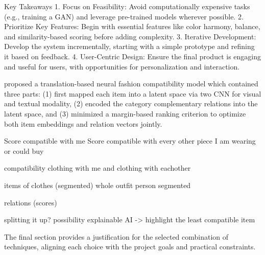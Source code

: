 Key Takeaways
1. Focus on Feasibility: Avoid computationally expensive tasks (e.g., training a GAN) and leverage pre-trained models wherever possible.
2. Prioritize Key Features: Begin with essential features like color harmony, balance, and similarity-based scoring before adding complexity.
3. Iterative Development: Develop the system incrementally, starting with a simple prototype and refining it based on feedback.
4. User-Centric Design: Ensure the final product is engaging and useful for users, with opportunities for personalization and interaction.

proposed a translation-based neural fashion compatibility model which contained three parts: (1) first mapped each item into a latent space via two CNN for visual and textual modality, (2) encoded the category complementary relations into the latent space, and (3) minimized a margin-based ranking criterion to optimize both item embeddings and relation vectors jointly.

Score compatible with me
Score compatible with every other piece I am wearing or could buy

compatibility clothing with me and clothing with eachother

items of clothes (segmented)
whole outfit
person segmented

relations (scores)


splitting it up? possibility
explainable AI -> highlight the least compatible item


The final section provides a justification for the selected combination of techniques, aligning each choice with the project goals and practical constraints.